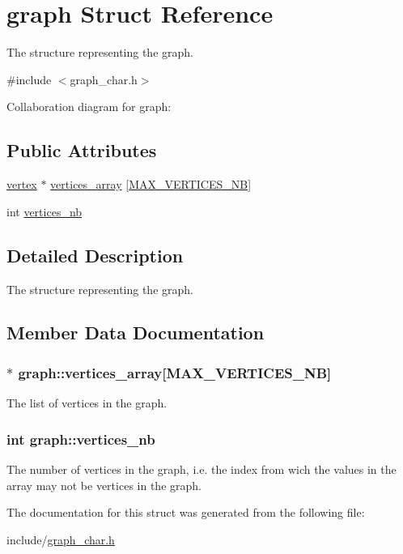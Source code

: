 \hypertarget{structgraph}{\section{graph Struct Reference}
\label{structgraph}
}


The structure representing the graph.  




{\ttfamily \#include $<$graph\-\_\-char.\-h$>$}



Collaboration diagram for graph\-:
\subsection*{Public Attributes}
\begin{DoxyCompactItemize}
\item 
\hyperlink{structvertex}{vertex} $\ast$ \hyperlink{structgraph_aadf10b62dae018b21871998bf8523fe2}{vertices\-\_\-array} \mbox{[}\hyperlink{graph__char_8h_addb0affa0061a7c6cc7402fe2d20daf0}{M\-A\-X\-\_\-\-V\-E\-R\-T\-I\-C\-E\-S\-\_\-\-N\-B}\mbox{]}
\item 
int \hyperlink{structgraph_adf3d1291593c3c83d1629f1bd1209825}{vertices\-\_\-nb}
\end{DoxyCompactItemize}


\subsection{Detailed Description}
The structure representing the graph. 

\subsection{Member Data Documentation}
\hypertarget{structgraph_aadf10b62dae018b21871998bf8523fe2}{
\subsubsection[{vertices\-\_\-array}]{$\ast$ graph\-::vertices\-\_\-array\mbox{[}{\bf M\-A\-X\-\_\-\-V\-E\-R\-T\-I\-C\-E\-S\-\_\-\-N\-B}\mbox{]}}}\label{structgraph_aadf10b62dae018b21871998bf8523fe2}
The list of vertices in the graph. \hypertarget{structgraph_adf3d1291593c3c83d1629f1bd1209825}{
\subsubsection[{vertices\-\_\-nb}]{\setlength{\rightskip}{0pt plus 5cm}int graph\-::vertices\-\_\-nb}}\label{structgraph_adf3d1291593c3c83d1629f1bd1209825}
The number of vertices in the graph, i.\-e. the index from wich the values in the array may not be vertices in the graph. 

The documentation for this struct was generated from the following file\-:\begin{DoxyCompactItemize}
\item 
include/\hyperlink{graph__char_8h}{graph\-\_\-char.\-h}\end{DoxyCompactItemize}
